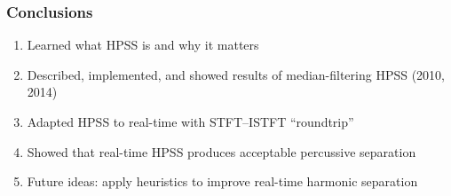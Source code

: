 \documentclass{beamer}
\begin{document}
\begin{frame}
	\frametitle{Conclusions}
	\begin{enumerate}
		\item Learned what HPSS is and why it matters
		\item Described, implemented, and showed results of median-filtering HPSS (2010, 2014)
		\item Adapted HPSS to real-time with STFT--ISTFT ``roundtrip''
		\item Showed that real-time HPSS produces acceptable percussive separation
		\item Future ideas: apply heuristics to improve real-time harmonic separation
	\end{enumerate}
\end{frame}
\end{document}
